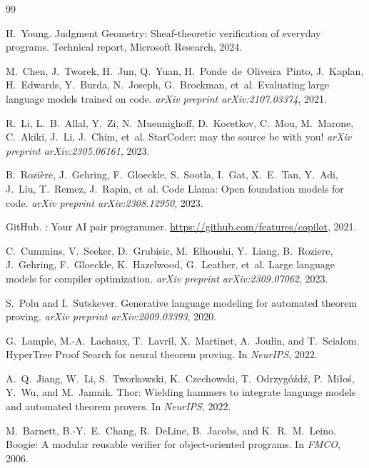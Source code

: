 \documentclass[11pt]{article}
\begin{document}
\begin{thebibliography}{99}

H.~Young.
\newblock Judgment Geometry: Sheaf-theoretic verification of everyday
  programs.
\newblock Technical report, Microsoft Research, 2024.

M.~Chen, J.~Tworek, H.~Jun, Q.~Yuan, H.~Ponde~de~Oliveira~Pinto,
  J.~Kaplan, H.~Edwards, Y.~Burda, N.~Joseph, G.~Brockman, et~al.
\newblock Evaluating large language models trained on code.
\newblock \emph{arXiv preprint arXiv:2107.03374}, 2021.

R.~Li, L.~B.~Allal, Y.~Zi, N.~Muennighoff, D.~Kocetkov,
  C.~Mou, M.~Marone, C.~Akiki, J.~Li, J.~Chim, et~al.
\newblock Star{C}oder: may the source be with you!
\newblock \emph{arXiv preprint arXiv:2305.06161}, 2023.

B.~Rozi{\`e}re, J.~Gehring, F.~Gloeckle, S.~Sootla,
  I.~Gat, X.~E.~Tan, Y.~Adi, J.~Liu, T.~Remez, J.~Rapin, et~al.
\newblock Code {L}lama: Open foundation models for code.
\newblock \emph{arXiv preprint arXiv:2308.12950}, 2023.

GitHub.
: Your {AI} pair programmer.
\newblock \url{https://github.com/features/copilot}, 2021.

C.~Cummins, V.~Seeker, D.~Grubisic, M.~Elhoushi, Y.~Liang,
  B.~Roziere, J.~Gehring, F.~Gloeckle, K.~Hazelwood, G.~Leather,
  et~al.
\newblock Large language models for compiler optimization.
\newblock \emph{arXiv preprint arXiv:2309.07062}, 2023.

S.~Polu and I.~Sutskever.
\newblock Generative language modeling for automated theorem proving.
\newblock \emph{arXiv preprint arXiv:2009.03393}, 2020.

G.~Lample, M.-A.~Lachaux, T.~Lavril, X.~Martinet, A.~Joulin,
  and T.~Scialom.
\newblock Hyper{T}ree Proof Search for neural theorem proving.
\newblock In \emph{NeurIPS}, 2022.

A.~Q.~Jiang, W.~Li, S.~Tworkowski, K.~Czechowski, T.~Odrzygóźdź,
  P.~Miłoś, Y.~Wu, and M.~Jamnik.
\newblock Thor: Wielding hammers to integrate language models and
  automated theorem provers.
\newblock In \emph{NeurIPS}, 2022.

M.~Barnett, B.-Y.~E.~Chang, R.~DeLine, B.~Jacobs, and
  K.~R.~M.~Leino.
\newblock Boogie: A modular reusable verifier for object-oriented
  programs.
\newblock In \emph{FMCO}, 2006.


\end{thebibliography}
\end{document}

